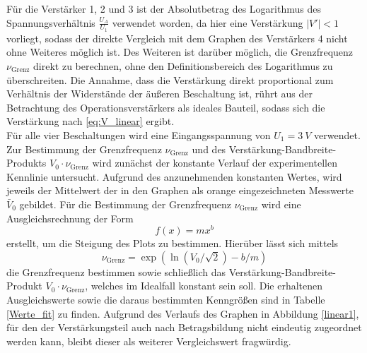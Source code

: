 Für die Verstärker 1, 2 und 3 ist der Absolutbetrag des Logarithmus des Spannungsverhältnis $\frac{U_A}{U_1}$ verwendet worden, da hier eine Verstärkung $|V'|<1$ vorliegt, sodass der direkte Vergleich mit dem Graphen des Verstärkers 4 nicht ohne Weiteres möglich ist. Des Weiteren ist darüber möglich, die Grenzfrequenz $\nu_\text{Grenz}$ direkt zu berechnen, ohne den Definitionsbereich des Logarithmus zu überschreiten.
Die Annahme, dass die Verstärkung direkt proportional zum Verhältnis der Widerstände der äußeren Beschaltung ist, rührt aus der Betrachtung des Operationsverstärkers als ideales Bauteil, sodass sich die Verstärkung nach \eqref{eq:V_linear} ergibt.\\
Für alle vier Beschaltungen wird eine Eingangsspannung von $U_1=\SI{3}{V}$ verwendet.
Zur Bestimmung der Grenzfrequenz $\nu_\text{Grenz}$ und des Verstärkung-Bandbreite-Produkts $V_0\cdot\nu_\text{Grenz}$ wird zunächst der konstante Verlauf der experimentellen Kennlinie untersucht. Aufgrund des anzunehmenden konstanten Wertes, wird jeweils der Mittelwert der in den Graphen als orange eingezeichneten Messwerte $\bar{V}_0$ gebildet.
Für die Bestimmung der Grenzfrequenz $\nu_\text{Grenz}$ wird eine Ausgleichsrechnung der Form
\begin{equation}
  f(x)=mx^b
\end{equation}
erstellt, um die Steigung des Plots zu bestimmen.
Hierüber lässt sich mittels
\begin{equation}
  \nu_\text{Grenz}=\exp(\ln(V_0/\sqrt{2})-b/m)
\end{equation}
die Grenzfrequenz bestimmen sowie schließlich das Verstärkung-Bandbreite-Produkt $V_0\cdot\nu_\text{Grenz}$, welches im Idealfall konstant sein soll. Die erhaltenen Ausgleichswerte sowie die daraus bestimmten Kenngrößen sind in Tabelle \ref{Werte_fit} zu finden. Aufgrund des Verlaufs des Graphen in Abbildung \ref{linear1}, für den der Verstärkungsteil auch nach Betragsbildung nicht eindeutig zugeordnet werden kann, bleibt dieser als weiterer Vergleichswert fragwürdig.

